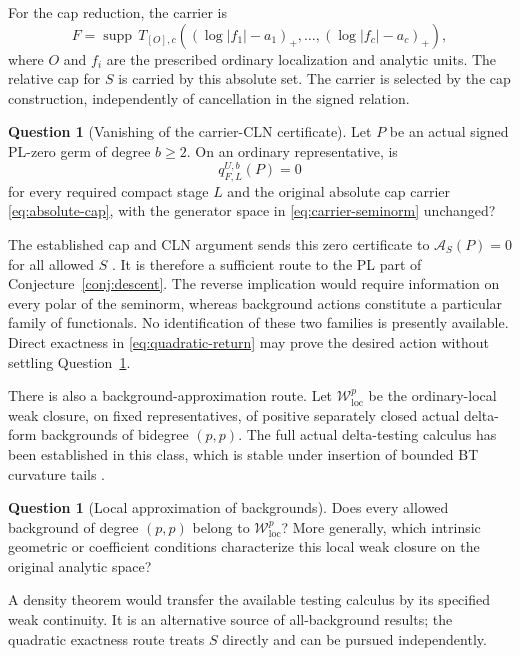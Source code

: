 \documentclass[11pt,a4paper]{article}
\newcommand{\MathEqref}[1]{{\hypersetup{linkcolor=EquationLink}\eqref{#1}}}
\newcommand{\Conjref}[1]{Conjecture~\ref{#1}}
\newcommand{\Questref}[1]{Question~\ref{#1}}
\theoremstyle{definition}
\newtheorem{question}[theorem]{Question}
\theoremstyle{remark}
\numberwithin{equation}{section}
\newcommand{\supp}{\operatorname{supp}}
\newcommand{\A}{\mathcal A}
\begin{document}
For the cap reduction, the carrier is
\begin{equation}
 F=\supp\,T_{[O],c}
       ((\log|f_1|-a_1)_+,\ldots,(\log|f_c|-a_c)_+),
                         \label{eq:absolute-cap}
\end{equation}
where $O$ and $f_i$ are the prescribed ordinary localization and
analytic units.  The relative cap for $S$ is carried by this absolute
set.  The carrier is selected by the cap construction, independently
of cancellation in the signed relation.

\begin{question}[Vanishing of the carrier-CLN certificate]
\label{question:carrier}
Let $P$ be an actual signed PL-zero germ of degree $b\ge2$.  On an
ordinary representative, is
\[
                            q^{U,b}_{F,L}(P)=0
\]
for every required compact stage $L$ and the original absolute cap
carrier \MathEqref{eq:absolute-cap}, with the generator space in
\MathEqref{eq:carrier-seminorm} unchanged?
\end{question}

The established cap and CLN argument sends this zero certificate to
$\A_S(P)=0$ for all allowed $S$ \cite{R24}.  It is therefore a
sufficient route to the PL part of \Conjref{conj:descent}.  The reverse implication
would require information on every polar of the seminorm, whereas
background actions constitute a particular family of functionals.
No identification of these two families is presently available.
Direct exactness in \MathEqref{eq:quadratic-return} may prove the
desired action without settling \Questref{question:carrier}.

There is also a background-approximation route.  Let
$\mathcal W^p_{\mathrm{loc}}$ be the ordinary-local weak closure, on
fixed representatives, of positive separately closed actual
delta-form backgrounds of bidegree $(p,p)$.  The full actual
delta-testing calculus has been established in this class, which is
stable under insertion of bounded BT curvature tails \cite{Rchain}.

\begin{question}[Local approximation of backgrounds]
\label{question:background-density}
Does every allowed background of degree $(p,p)$ belong to
$\mathcal W^p_{\mathrm{loc}}$?  More generally, which intrinsic
geometric or coefficient conditions characterize this local weak
closure on the original analytic space?
\end{question}

A density theorem would transfer the available testing calculus by
its specified weak continuity.  It is an alternative source of
all-background results; the quadratic exactness route treats $S$
directly and can be pursued independently.
\end{document}
